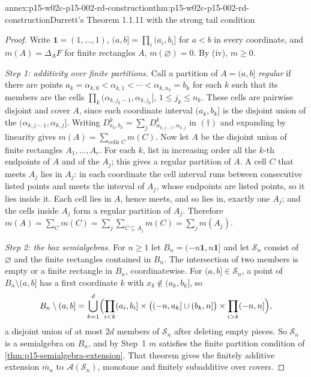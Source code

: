 \begin{annexitem}{annex:p15-w02c-p15-002-rd-construction}{thm:p15-w02c-p15-002-rd-construction}{Durrett's Theorem 1.1.11 with the strong tail condition}
\begin{proof}
Write \(\mathbf1=(1,\ldots,1)\), \((a,b]=\prod_i(a_i,b_i]\) for
\(a<b\) in every coordinate, and \(m(A)=\Delta_AF\) for finite rectangles
\(A\), \(m(\varnothing)=0\). By (iv), \(m\geq0\).

\emph{Step 1: additivity over finite partitions.} Call a partition of
\(A=(a,b]\) \emph{regular} if there are points
\(a_k=\alpha_{k,0}<\alpha_{k,1}<\cdots<\alpha_{k,n_k}=b_k\) for each \(k\)
such that its members are the cells
\(\prod_k(\alpha_{k,j_k-1},\alpha_{k,j_k}]\), \(1\leq j_k\leq n_k\).
These cells are pairwise disjoint and cover \(A\), since each coordinate
interval \((a_k,b_k]\) is the disjoint union of the
\((\alpha_{k,j-1},\alpha_{k,j}]\). Writing
\(D^k_{a_k,b_k}=\sum_jD^k_{\alpha_{k,j-1},\alpha_{k,j}}\) in \((\dagger)\)
and expanding by linearity gives \(m(A)=\sum_{\text{cells }C}m(C)\).
Now let \(A\) be the disjoint union of finite rectangles
\(A_1,\ldots,A_r\). For each \(k\), list in increasing order all the
\(k\)-th endpoints of \(A\) and of the \(A_j\); this gives a regular
partition of \(A\). A cell \(C\) that meets \(A_j\) lies in \(A_j\): in each
coordinate the cell interval runs between consecutive listed points and
meets the interval of \(A_j\), whose endpoints are listed points, so it lies
inside it. Each cell lies in \(A\), hence meets, and so lies in, exactly
one \(A_j\); and the cells inside \(A_j\) form a regular partition of
\(A_j\). Therefore
\(m(A)=\sum_Cm(C)=\sum_j\sum_{C\subseteq A_j}m(C)=\sum_jm(A_j)\).

\emph{Step 2: the box semialgebras.} For \(n\geq1\) let
\(B_n=(-n\mathbf1,n\mathbf1]\) and let \(\mathcal S_n\) consist of
\(\varnothing\) and the finite rectangles contained in \(B_n\). The
intersection of two members is empty or a finite rectangle in \(B_n\),
coordinatewise. For \((a,b]\in\mathcal S_n\), a point of
\(B_n\setminus(a,b]\) has a first coordinate \(k\) with
\(x_k\notin(a_k,b_k]\), so
\[
 B_n\setminus(a,b]=\bigcup_{k=1}^d\Bigl(\prod_{i<k}(a_i,b_i]
   \times\bigl((-n,a_k]\cup(b_k,n]\bigr)\times\prod_{i>k}(-n,n]\Bigr),
\]
a disjoint union of at most \(2d\) members of \(\mathcal S_n\) after
deleting empty pieces. So \(\mathcal S_n\) is a semialgebra on \(B_n\), and
by Step~1 \(m\) satisfies the finite partition condition of
\cref{thm:p15-semialgebra-extension}. That theorem gives the finitely
additive extension \(\overline m_n\) to \(\mathcal A(\mathcal S_n)\), monotone
and finitely subadditive over covers.


\end{proof}
\end{annexitem}
